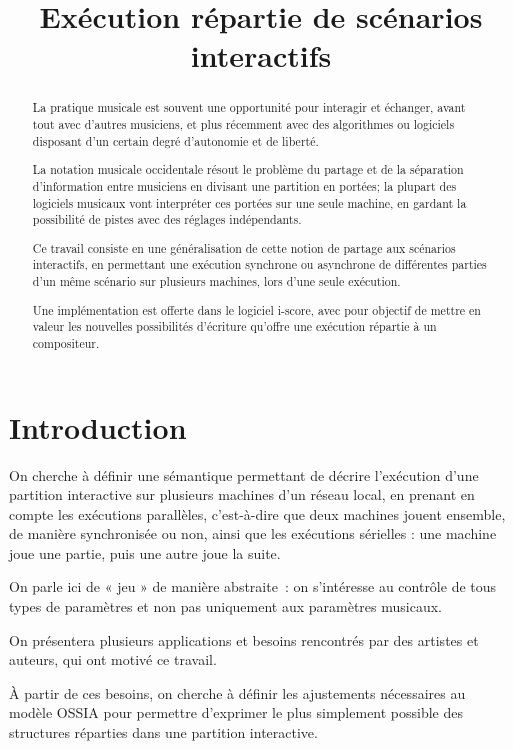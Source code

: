 \documentclass{article}
\title{Exécution répartie de scénarios interactifs}
\newcommand\ossia{OSSIA\xspace}
\begin{document}
\maketitle
\begin{abstract}
    La pratique musicale est souvent une opportunité pour interagir et échanger, 
    avant tout avec d'autres musiciens, et plus récemment avec des algorithmes ou logiciels 
    disposant d'un certain degré d'autonomie et de liberté.
    
    La notation musicale occidentale résout le problème du partage et de la séparation d'information entre musiciens 
    en divisant une partition en portées; la plupart des logiciels musicaux vont interpréter ces portées sur une seule machine, en gardant la possibilité de pistes avec des réglages indépendants. 
    
    Ce travail consiste en une généralisation de cette notion de partage aux scénarios interactifs, en permettant une exécution synchrone ou asynchrone de différentes parties d'un même scénario sur plusieurs machines, lors d'une seule exécution.
    
    Une implémentation est offerte dans le logiciel i-score, avec pour objectif de mettre en valeur 
    les nouvelles possibilités d'écriture qu'offre une exécution répartie à un compositeur.
\end{abstract}

\section{Introduction}
On cherche à définir une sémantique permettant de décrire l'exécution d'une partition interactive sur plusieurs machines d'un réseau local, en prenant en compte les exécutions parallèles, c'est-à-dire que deux machines jouent ensemble, de manière synchronisée ou non, ainsi que les exécutions sérielles : une machine joue une partie, puis une autre joue la suite.

On parle ici de « jeu » de manière abstraite~: on s'intéresse au contrôle de tous types de paramètres et non pas uniquement aux paramètres musicaux.

On présentera plusieurs applications et besoins rencontrés par des artistes et auteurs, qui ont motivé ce travail.

À partir de ces besoins, on cherche à définir les ajustements nécessaires au modèle \ossia pour permettre d'exprimer le plus simplement possible des structures réparties dans une partition interactive.
\end{document}
